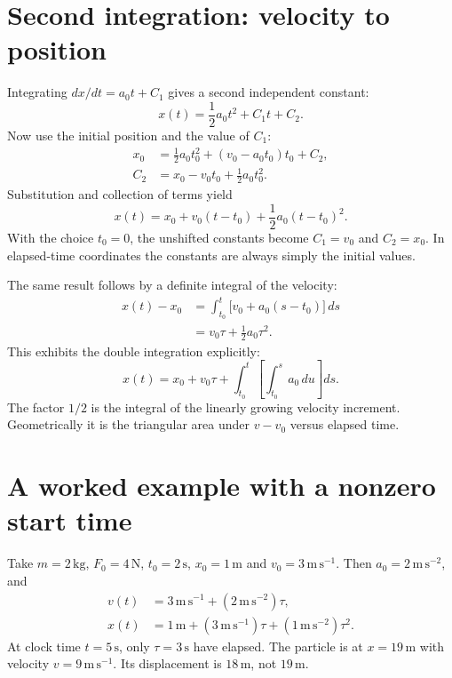 \section{Second integration: velocity to position}
Integrating $dx/dt=a_0t+C_1$ gives a second independent constant:
\begin{equation}
 x(t)=\frac{1}{2}a_0t^2+C_1t+C_2.
\end{equation}
Now use the initial position and the value of $C_1$:
\begin{align}
 x_0 &= \frac{1}{2}a_0t_0^2+(v_0-a_0t_0)t_0+C_2,\\
 C_2 &= x_0-v_0t_0+\frac{1}{2}a_0t_0^2.
\end{align}
Substitution and collection of terms yield
\begin{equation}
 \boxed{x(t)=x_0+v_0(t-t_0)+\frac{1}{2}a_0(t-t_0)^2.}
\end{equation}
With the choice $t_0=0$, the unshifted constants become $C_1=v_0$ and $C_2=x_0$.
In elapsed-time coordinates the constants are always simply the initial values.

The same result follows by a definite integral of the velocity:
\begin{align}
 x(t)-x_0
 &=\int_{t_0}^{t}\bigl[v_0+a_0(s-t_0)\bigr]\,ds\\
 &=v_0\tau+\frac{1}{2}a_0\tau^2.
\end{align}
This exhibits the double integration explicitly:
\begin{equation}
 x(t)=x_0+v_0\tau+
 \int_{t_0}^{t}\left[\int_{t_0}^{s}a_0\,du\right]ds.
\end{equation}
The factor $1/2$ is the integral of the linearly growing velocity increment.
Geometrically it is the triangular area under $v-v_0$ versus elapsed time.

\section{A worked example with a nonzero start time}
Take $m=2\,\mathrm{kg}$, $F_0=4\,\mathrm{N}$, $t_0=2\,\mathrm{s}$,
$x_0=1\,\mathrm{m}$ and $v_0=3\,\mathrm{m\,s^{-1}}$. Then
$a_0=2\,\mathrm{m\,s^{-2}}$, and
\begin{align}
 v(t)&=3\,\mathrm{m\,s^{-1}}+(2\,\mathrm{m\,s^{-2}})\tau,\\
 x(t)&=1\,\mathrm{m}+(3\,\mathrm{m\,s^{-1}})\tau
                   +(1\,\mathrm{m\,s^{-2}})\tau^2.
\end{align}
At clock time $t=5\,\mathrm{s}$, only $\tau=3\,\mathrm{s}$ have elapsed.
The particle is at $x=19\,\mathrm{m}$ with velocity $v=9\,\mathrm{m\,s^{-1}}$.
Its displacement is $18\,\mathrm{m}$, not $19\,\mathrm{m}$.

